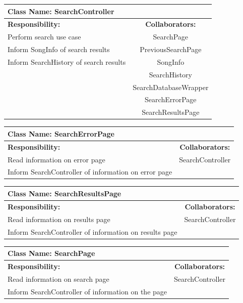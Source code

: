 \documentclass[]{article}
\begin{document}
	\begin{table}[!htb]
		\centering
		\begin{tabular}{| p{7cm} | c |} \hline
			\multicolumn{2}{|l|}{\textbf{Class Name: SearchController}} \\ \hline
			\textbf{Responsibility:} & \textbf{Collaborators:} \\ \hline
			Perform search use case & SearchPage \\ \hline
			Inform SongInfo of search results & PreviousSearchPage \\ \hline
			Inform SearchHistory of search results & SongInfo \\ \hline
			& SearchHistory \\ \hline
			& SearchDatabaseWrapper \\ \hline
			& SearchErrorPage \\ \hline
			& SearchResultsPage \\ \hline
		\end{tabular}
	\end{table}
	
	\begin{table}[!htb]
		\centering
		\begin{tabular}{| p{8cm} | c |} \hline
			\multicolumn{2}{|l|}{\textbf{Class Name: SearchErrorPage}} \\ \hline
			\textbf{Responsibility:} & \textbf{Collaborators:} \\ \hline
			Read information on error page & SearchController \\ \hline
			Inform SearchController of information on error page &   \\ \hline
		\end{tabular}
	\end{table}
	
	\begin{table}[!htb]
		\centering
		\begin{tabular}{| p{8cm} | c |} \hline
			\multicolumn{2}{|l|}{\textbf{Class Name: SearchResultsPage}} \\ \hline
			\textbf{Responsibility:} & \textbf{Collaborators:} \\ \hline
			Read information on results page & SearchController \\ \hline
			Inform SearchController of information on results page &   \\ \hline
		\end{tabular}
	\end{table}
	
	\begin{table}[!htb]
		\centering
		\begin{tabular}{| p{8cm} | c |} \hline
			\multicolumn{2}{|l|}{\textbf{Class Name: SearchPage}} \\ \hline
			\textbf{Responsibility:} & \textbf{Collaborators:} \\ \hline
			Read information on search page & SearchController \\ \hline
			Inform SearchController of information on the page &   \\ \hline
		\end{tabular}
	\end{table}
	
\end{document}
